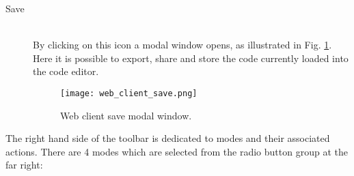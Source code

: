\begin{description}
  \item[ Save]~\\
    By clicking on this icon a modal window opens, as illustrated in Fig. \ref{fig:web_client_save}. Here it is possible to export, share and store the code currently loaded into the code editor.
    \begin{figure}
      \texttt{[image: web\_client\_save.png]}
      \caption{Web client save modal window.}
      \label{fig:web_client_save}
    \end{figure}

\end{description}

The right hand side of the toolbar is dedicated to modes and their associated actions. There are 4 modes which are selected from the radio button group at the far right:

